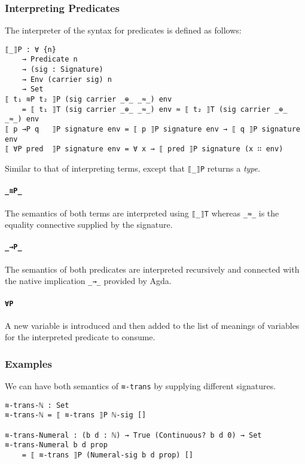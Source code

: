 \documentclass[\main/thesis.tex]{subfiles}
\begin{document}
\subsubsection{Interpreting Predicates}

The interpreter of the syntax for predicates is defined as follows:

\begin{lstlisting}[basicstyle=\ttfamily\scriptsize]
⟦_⟧P : ∀ {n}
    → Predicate n
    → (sig : Signature)
    → Env (carrier sig) n
    → Set
⟦ t₁ ≋P t₂ ⟧P (sig carrier _⊕_ _≈_) env
    = ⟦ t₁ ⟧T (sig carrier _⊕_ _≈_) env ≈ ⟦ t₂ ⟧T (sig carrier _⊕_ _≈_) env
⟦ p →P q   ⟧P signature env = ⟦ p ⟧P signature env → ⟦ q ⟧P signature env
⟦ ∀P pred  ⟧P signature env = ∀ x → ⟦ pred ⟧P signature (x ∷ env)
\end{lstlisting}

Similar to that of interpreting terms, except that \lstinline|⟦_⟧P| returns a
\textit{type}.

\paragraph{\lstinline|_≋P_|}
The semantics of both terms are interpreted using \lstinline|⟦_⟧T|
whereas \lstinline|_≈_| is the equality connective supplied by the signature.

\paragraph{\lstinline|_→P_|}
The semantics of both predicates are interpreted recursively
and connected with the native implication \lstinline|_→_| provided by Agda.

\paragraph{\lstinline|∀P|}
A new variable is introduced and then added to the list of meanings of variables
for the interpreted predicate to consume.

\subsubsection{Examples}

We can have both semantics of \lstinline|≋-trans| by supplying different
signatures.

\begin{lstlisting}
≋-trans-ℕ : Set
≋-trans-ℕ = ⟦ ≋-trans ⟧P ℕ-sig []

≋-trans-Numeral : (b d : ℕ) → True (Continuous? b d 0) → Set
≋-trans-Numeral b d prop
    = ⟦ ≋-trans ⟧P (Numeral-sig b d prop) []
\end{lstlisting}
\end{document}
